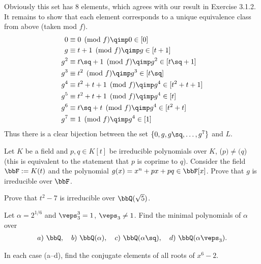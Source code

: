 \documentclass{article}
\begin{document}
\begin{solution}
Obviously this set has 8 elements, which agrees with our result in Exercise 3.1.2. It remains to show that each element corresponds to a unique equivalence class from above (taken mod $ f $).
\begin{align*}
  0   &\equiv 0\pmod f \qimp 0 \in [0] \\
  g   &\equiv t+1\pmod f \qimp g\in [t+1] \\
  g^2 &\equiv t\sq+1\pmod f \qimp g^2\in [t\sq+1] \\
  g^3 &\equiv t^2 \pmod f \qimp g^3\in [t\sq] \\
  g^4 &\equiv t^2+t+1 \pmod f \qimp g^4\in [t^2+t+1] \\
  g^5 &\equiv t^2+t+1 \pmod f \qimp g^4\in [t] \\
  g^6 &\equiv t\sq+t \pmod f \qimp g^4\in [t^2+t] \\
  g^7 &\equiv 1 \pmod f \qimp g^4\in [1]
\end{align*}
Thus there is a clear bijection between the set $ \{0,g,g\sq,\ldots,g^7\} $ and $ L $.
\end{solution}

\begin{exercise}
Let $K$ be a field and $p, q \in K[t]$ be irreducible polynomials over $K$, ($p) \neq (q$) (this is equivalent to the statement that $p$ is coprime to $q$). Consider the field $\bbF := K(t)$ and the polynomial $g(x) = x^n + px + pq \in \bbF[x]$. Prove that $g$ is irreducible over $\bbF$.
\end{exercise}

\begin{exercise}
Prove that $ t^2 -7 $ is irreducible over $ \bbQ(\sqrt 5) $.
\end{exercise}

\begin{subexercise}
Let $ \alpha=2^{1/6} $ and $ \veps_3^3=1 $, $ \veps_3\neq 1 $. Find the minimal polynomials of $ \alpha $ over \begin{align*}
  a)\ \bbQ, \quad b)\ \bbQ(\alpha), \quad c)\ \bbQ(\alpha\sq), \quad d)\ \bbQ(\alpha\veps_3).
\end{align*}
\end{subexercise}

\begin{subexercise}
In each case (a--d), find the conjugate elements of all roots of $ x^6-2 $.
\end{subexercise}
\end{document}
